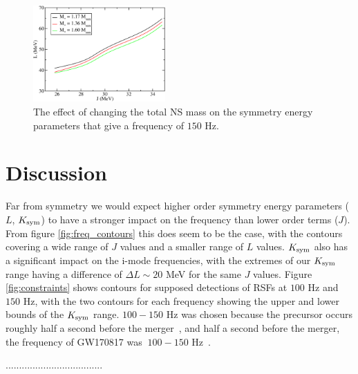 \documentclass[fleqn,usenatbib]{mnras}
\begin{document}
\begin{figure}
\centering
\includegraphics[width=0.45\textwidth,angle=0]{K40_f150_Mcomp.pdf}
\caption{The effect of changing the total NS mass on the symmetry energy parameters that give a frequency of $150$ Hz.}
\label{fig:vary_mass_contours}
\end{figure}







\section{Discussion}
\hspace{\parindent}Far from symmetry we would expect higher order symmetry energy parameters ($L$, $K_{\rm sym}$) to have a stronger impact on the frequency than lower order terms ($J$). From figure \ref{fig:freq_contours} this does seem to be the case, with the contours covering a wide range of $J$ values and a smaller range of $L$ values. $K_{\rm sym}$ also has a significant impact on the i-mode frequencies, with the extremes of our $K_{\rm sym}$ range having a difference of $\Delta L\sim 20$ MeV for the same $J$ values. Figure \ref{fig:constraints} shows contours for supposed detections of RSFs at $100$ Hz and $150$ Hz, with the two contours for each frequency showing the upper and lower bounds of the $K_{\rm sym}$ range. $100-150$ Hz was chosen because the precursor occurs roughly half a second before the merger~\citet{zhong2019precursors}, and half a second before the merger, the frequency of GW170817 was $~100-150$ Hz~\citet{abbott2017merger}.

\hspace{\parindent}....................................
\end{document}
